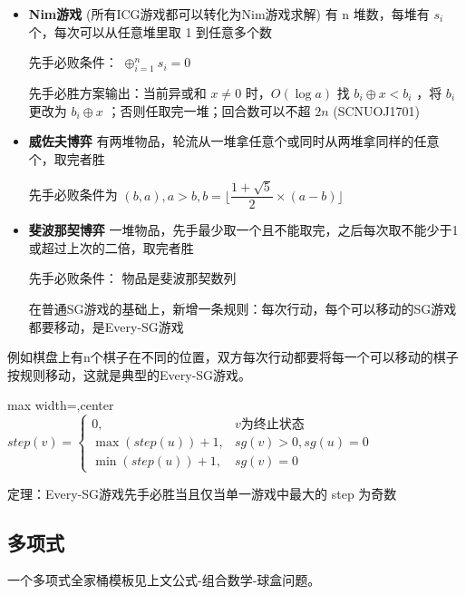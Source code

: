 \documentclass[twocolumn,10pt]{ctexart}
\begin{document}
\begin{itemize}
\item \textbf{Nim游戏} (所有ICG游戏都可以转化为Nim游戏求解) 有 n 堆数，每堆有 $s_i$ 个，每次可以从任意堆里取 1 到任意多个数

先手必败条件： $\oplus_{i=1}^ns_i=0$

先手必胜方案输出：当前异或和 $x\neq0$ 时，$O(\log a)$ 找 $b_i\oplus x < b_i$ ，将 $b_i$ 更改为 $b_i\oplus x$ ；否则任取完一堆；回合数可以不超 $2n$ (SCNUOJ1701)
\end{itemize}

\begin{itemize}
\item \textbf{威佐夫博弈}  有两堆物品，轮流从一堆拿任意个或同时从两堆拿同样的任意个，取完者胜

先手必败条件为 $(b,\allowbreak{}a),\allowbreak{}a > b,\allowbreak{} b=\lfloor\dfrac{1+\sqrt5}2\times(a-b)\rfloor$
\end{itemize}

\begin{itemize}
\item \textbf{斐波那契博弈} 一堆物品，先手最少取一个且不能取完，之后每次取不能少于1或超过上次的二倍，取完者胜

先手必败条件： 物品是斐波那契数列

在普通SG游戏的基础上，新增一条规则：每次行动，每个可以移动的SG游戏都要移动，是Every-SG游戏
\end{itemize}

\begin{notebox}
例如棋盘上有n个棋子在不同的位置，双方每次行动都要将每一个可以移动的棋子按规则移动，这就是典型的Every-SG游戏。
\end{notebox}

\begin{adjustbox}{max width=\linewidth,center}
$step(v)=\begin{cases}
0,&v\text{为终止状态}\\
\max(step(u))+1,&sg(v)>0,sg(u)=0\\
\min(step(u))+1,&sg(v)=0
\end{cases}$
\end{adjustbox}

定理：Every-SG游戏先手必胜当且仅当单一游戏中最大的 step 为奇数

\subsection{多项式}

\begin{notebox}
一个多项式全家桶模板见上文公式-组合数学-球盒问题。
\end{notebox}
\end{document}

